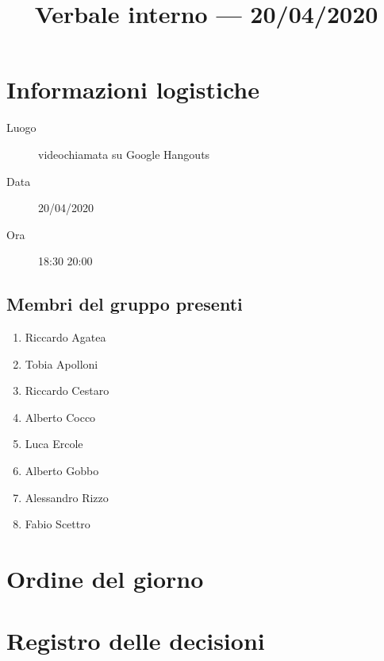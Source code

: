 \documentclass{article}
\title{Verbale interno --- 20/04/2020}
\begin{document}


\section{Informazioni logistiche}%
\label{sec:informazioni_logistiche}

\begin{description}
  \item [Luogo] videochiamata su Google Hangouts
  \item [Data] 20/04/2020
  \item [Ora] 18:30  20:00
\end{description}

\subsection{Membri del gruppo presenti}%
\label{sub:membri_del_gruppo_presenti}

\begin{enumerate}
  \item Riccardo Agatea
  \item Tobia Apolloni
  \item Riccardo Cestaro
  \item Alberto Cocco
  \item Luca Ercole
  \item Alberto Gobbo
  \item Alessandro Rizzo
  \item Fabio Scettro
\end{enumerate}

\section{Ordine del giorno}%
\label{sec:ordine_del_giorno}

\newpage
\section{Registro delle decisioni}%
\label{sec:registro_delle_decisioni}

\end{document}
